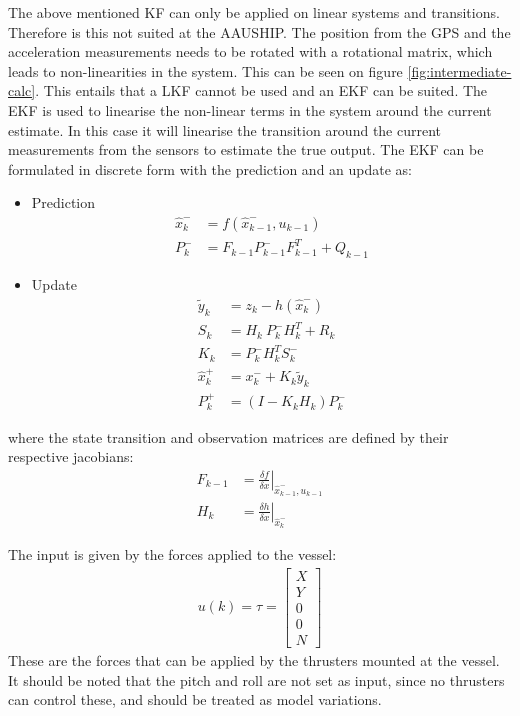The above mentioned \ac{KF} can only be applied on linear systems and transitions. Therefore is this not suited at the AAUSHIP. The position from the \ac{GPS} and the acceleration measurements needs to be rotated with a rotational matrix, which leads to non-linearities in the system. This can be seen on figure \vref{fig:intermediate-calc}. This entails that a \ac{LKF} cannot be used and an \ac{EKF} can be suited. The \ac{EKF} is used to linearise the non-linear terms in the system around the current estimate. In this case it will linearise the transition around the current measurements from the sensors to estimate the true output. The \ac{EKF} can be formulated in discrete form with the prediction and an update as:
\begin{itemize}
\item Prediction
\begin{align}
\hat x_k^- &= f(\hat x_{k-1}^-,u_{k-1})\\
P_k^- &= F_{k-1}P_{k-1}^-F_{k-1}^T+Q_{k-1}
\end{align}

\item Update
\begin{align}
\tilde y_k &= z_k - h(\hat x_k^-)\\
S_k &= H_k\ P_k^-H_k^T + R_k\\
K_k &= P_k^-H_k^TS_k^-\\
\hat x_k^+ &= x_k^- + K_k \tilde y_k\\
P_k^+ &= (I - K_k H_k) P_k^-
\end{align}
\end{itemize}
where the state transition and observation matrices are defined by their respective jacobians:
\begin{align}
F_{k-1} &= \left.\frac{\delta f}{\delta x}\right|_{\hat x_{k-1}^-,u_{k-1}}\\
H_k &= \left.\frac{\delta h}{\delta x}\right|_{\hat x_{k}^-}
\end{align}

The input is given by the forces applied to the vessel:
\begin{align}
u(k) = \tau =
\begin{bmatrix}
X\\
Y\\
0\\
0\\
N
\end{bmatrix}
\end{align}
These are the forces that can be applied by the thrusters mounted at the vessel. It should be noted that the pitch and roll are not set as input, since no thrusters can control these, and should be treated as model variations.

